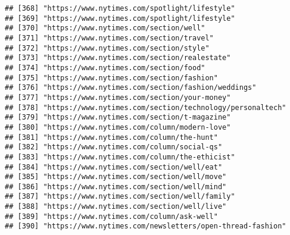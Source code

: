 \documentclass[
]{article}
\begin{document}
\begin{verbatim}
## [368] "https://www.nytimes.com/spotlight/lifestyle"                                                               
## [369] "https://www.nytimes.com/spotlight/lifestyle"                                                               
## [370] "https://www.nytimes.com/section/well"                                                                      
## [371] "https://www.nytimes.com/section/travel"                                                                    
## [372] "https://www.nytimes.com/section/style"                                                                     
## [373] "https://www.nytimes.com/section/realestate"                                                                
## [374] "https://www.nytimes.com/section/food"                                                                      
## [375] "https://www.nytimes.com/section/fashion"                                                                   
## [376] "https://www.nytimes.com/section/fashion/weddings"                                                          
## [377] "https://www.nytimes.com/section/your-money"                                                                
## [378] "https://www.nytimes.com/section/technology/personaltech"                                                   
## [379] "https://www.nytimes.com/section/t-magazine"                                                                
## [380] "https://www.nytimes.com/column/modern-love"                                                                
## [381] "https://www.nytimes.com/column/the-hunt"                                                                   
## [382] "https://www.nytimes.com/column/social-qs"                                                                  
## [383] "https://www.nytimes.com/column/the-ethicist"                                                               
## [384] "https://www.nytimes.com/section/well/eat"                                                                  
## [385] "https://www.nytimes.com/section/well/move"                                                                 
## [386] "https://www.nytimes.com/section/well/mind"                                                                 
## [387] "https://www.nytimes.com/section/well/family"                                                               
## [388] "https://www.nytimes.com/section/well/live"                                                                 
## [389] "https://www.nytimes.com/column/ask-well"                                                                   
## [390] "https://www.nytimes.com/newsletters/open-thread-fashion"                                                   

\end{verbatim}
\end{document}
